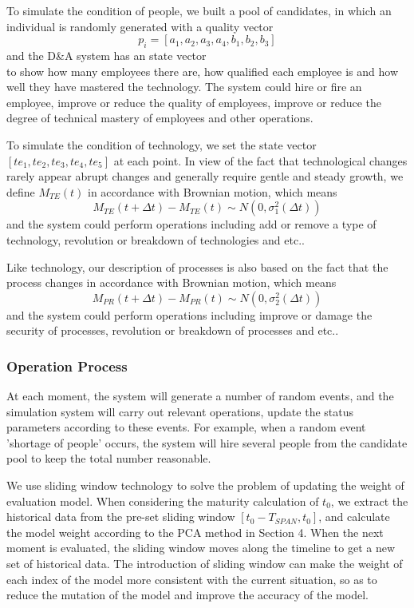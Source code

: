 \documentclass{mcmthesis}
\begin{document}
To simulate the condition of people, we built a pool of candidates, in which an individual is randomly generated with a quality vector
\begin{equation}
    p_i = [a_1,a_2,a_3,a_4,b_1,b_2,b_3]
\end{equation}
and the D\&A system has an state vector 
\begin{equation}
    [p_1,p_2,\dots,p_n,pe_3,pe_4]
\end{equation}
to show how many employees there are, how qualified each employee is and how well they have mastered the technology. The system could hire or fire an employee, improve or reduce the quality of employees, improve or reduce the degree of technical mastery of employees and other operations.

To simulate the condition of technology, we set the state vector $[te_1,te_2,te_3,te_4,te_5]$ at each point. In view of the fact that technological changes rarely appear abrupt changes and generally require gentle and steady growth, we define $M_{TE}(t)$ in accordance with Brownian motion\cite{5}, which means
\begin{equation}
M_{TE}(t+\Delta t)-M_{TE}(t) \sim N(0, \sigma_1^2(\Delta t))
\end{equation}
and the system could perform operations including add or remove a type of technology, revolution or breakdown of technologies and etc..

Like technology, our description of processes is also based on the fact that the process changes in accordance with Brownian motion, which means
\begin{equation}
    M_{PR}(t+\Delta t)-M_{PR}(t) \sim N(0, \sigma_2^2(\Delta t))
\end{equation}
and the system could perform operations including improve or damage the security of processes, revolution or breakdown of processes and etc..

\subsubsection{Operation Process}
At each moment, the system will generate a number of random events, and the simulation system will carry out relevant operations, update the status parameters according to these events. For example, when a random event 'shortage of people' occurs, the system will hire several people from the candidate pool to keep the total number reasonable.

We use sliding window technology to solve the problem of updating the weight of evaluation model. When considering the maturity calculation of $t_0$, we extract the historical data from the pre-set sliding window $[t_0-T_{SPAN},t_0]$, and calculate the model weight according to the PCA method in Section 4. When the next moment is evaluated, the sliding window moves along the timeline to get a new set of historical data. The introduction of sliding window can make the weight of each index of the model more consistent with the current situation, so as to reduce the mutation of the model and improve the accuracy of the model.
\end{document}
